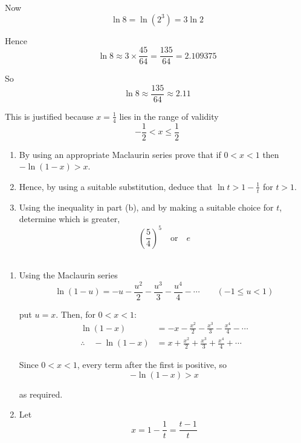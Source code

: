 \documentclass[leqno]{article}
\begin{document}
\begin{enumerate}[
  label=\textbf{\arabic*.},
  leftmargin=*,
  topsep=0pt,
  partopsep=0pt,
  parsep=0pt
]
\begin{djsSolution}
\begin{enumerate}[label=\textbf{(\alph*)}]
Now
\[
\ln 8=\ln(2^3)=3\ln 2
\]

Hence
\[
\ln 8 \approx 3\times \frac{45}{64}=\frac{135}{64}=2.109375
\]

So
\[
\ln 8 \approx \frac{135}{64} \approx 2.11
\]

This is justified because $x=\frac14$ lies in the range of validity
\[
-\frac12<x\leq \frac12
\]
  \end{enumerate}
\end{djsSolution}


\newpage

\questionitem

\begin{enumerate}[label=\textbf{(\alph*)}]
  \item By using an appropriate Maclaurin series prove that if $0 < x < 1$ then $-\ln(1-x) > x$.  \\
  \item Hence, by using a suitable substitution, deduce that $\ln t > 1 - \frac{1}{t}$ for $t > 1$.  \\
  \item Using the inequality in part (b), and by making a suitable choice for $t$, determine which is greater, \[\left(\frac{5}{4}\right)^5 \quad \text{or}\quad e\]  \\
\end{enumerate}

\vspace*{10pt}

\begin{djsSolution}
\begin{enumerate}[label=\textbf{(\alph*)}]
  \item Using the Maclaurin series
  \[
  \ln(1-u)=-u-\frac{u^2}{2}-\frac{u^3}{3}-\frac{u^4}{4}-\cdots\qquad (-1\leq u<1)
  \]

  put $u=x$. Then, for $0<x<1$:
  \begin{align*}
  \ln(1-x)&=-x-\frac{x^2}{2}-\frac{x^3}{3}-\frac{x^4}{4}-\cdots \\
  \therefore\quad -\ln(1-x)&=x+\frac{x^2}{2}+\frac{x^3}{3}+\frac{x^4}{4}+\cdots
  \end{align*}

  Since $0<x<1$, every term after the first is positive, so
  \[
  -\ln(1-x)>x
  \]

  as required.

  \item Let
  \[
  x=1-\frac1t=\frac{t-1}{t}
  \]


\end{enumerate}
\end{djsSolution}
\end{enumerate}
\end{document}
